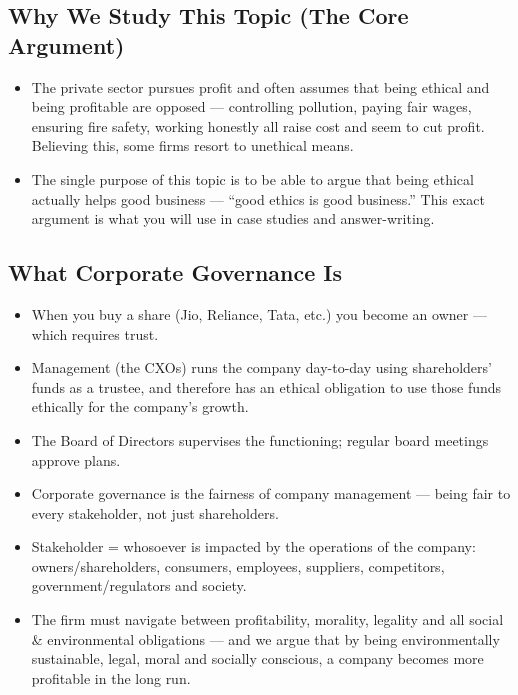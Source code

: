 \subsection{Why We Study This Topic (The Core Argument)}
\begin{KeyConcept}
\begin{itemize}
\item The private sector pursues profit and often assumes that being ethical and being profitable are opposed --- controlling pollution, paying fair wages, ensuring fire safety, working honestly all raise cost and seem to cut profit. Believing this, some firms resort to unethical means.
\item The single purpose of this topic is to be able to argue that being ethical actually helps good business --- ``good ethics is good business.'' This exact argument is what you will use in case studies and answer-writing.
\end{itemize}
\end{KeyConcept}

\subsection{What Corporate Governance Is}
\begin{itemize}
\item When you buy a share (Jio, Reliance, Tata, etc.) you become an owner --- which requires trust.
\item Management (the CXOs) runs the company day-to-day using shareholders' funds as a trustee, and therefore has an ethical obligation to use those funds ethically for the company's growth.
\item The Board of Directors supervises the functioning; regular board meetings approve plans.
\end{itemize}

\begin{KeyConcept}
\begin{itemize}
\item Corporate governance is the fairness of company management --- being fair to every stakeholder, not just shareholders.
\item Stakeholder = whosoever is impacted by the operations of the company: owners/shareholders, consumers, employees, suppliers, competitors, government/regulators and society.
\item The firm must navigate between profitability, morality, legality and all social \& environmental obligations --- and we argue that by being environmentally sustainable, legal, moral and socially conscious, a company becomes more profitable in the long run.
\end{itemize}
\end{KeyConcept}

